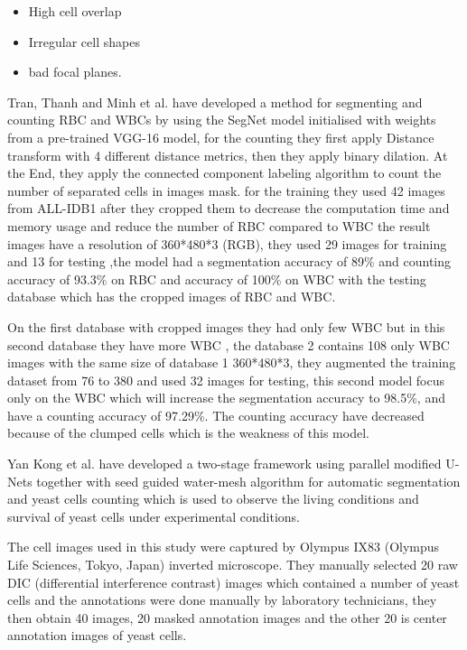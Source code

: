 \documentclass[conference]{IEEEtran}
\begin{document}
\begin{itemize}
  \item High cell overlap
  \item Irregular cell shapes
  \item bad focal planes.
\end{itemize}

Tran, Thanh and Minh et al. \cite{tran2019blood} have developed a method for segmenting and counting RBC and WBCs by using the SegNet model initialised with weights from a pre-trained VGG-16 model, for the counting they first apply Distance transform with 4 different distance metrics, then they apply binary dilation. At the End, they apply the connected component labeling algorithm to count the number of separated cells in images mask. for the training they used 42 images from ALL-IDB1 \cite{labati2011all} after they cropped them to decrease the computation time and memory usage and reduce the number of RBC compared to WBC the result images have a resolution of 360*480*3 (RGB), they used 29 images for training and 13 for testing ,the model had a segmentation accuracy of 89\% and counting accuracy of 93.3\% on RBC and accuracy of 100\% on WBC with the testing database which has the cropped images of RBC and WBC.\

On the first database with cropped images they had only few WBC but in this second database they have more WBC , the database 2 contains 108 only WBC images with the same size of database 1 360*480*3, they augmented the training dataset from 76 to 380 and used 32 images for testing, this second model focus only on the WBC which will increase the segmentation accuracy to 98.5\%, and have a counting accuracy of 97.29\%. The counting accuracy have decreased because of the clumped cells which is the weakness of this model.

Yan Kong et al.\cite{Kong:20} have developed a two-stage framework using parallel modified U-Nets together with seed guided water-mesh algorithm for automatic segmentation and yeast cells counting which is used to observe the living conditions and survival of yeast cells under experimental conditions.\

The cell images used in this study were captured by Olympus IX83 (Olympus Life Sciences, Tokyo, Japan) inverted microscope. They manually selected 20 raw DIC (differential interference contrast) images which contained a number of yeast cells and the annotations were done manually by laboratory technicians, they then obtain 40 images, 20 masked annotation images and the other 20 is center annotation images of yeast cells.\
\end{document}
